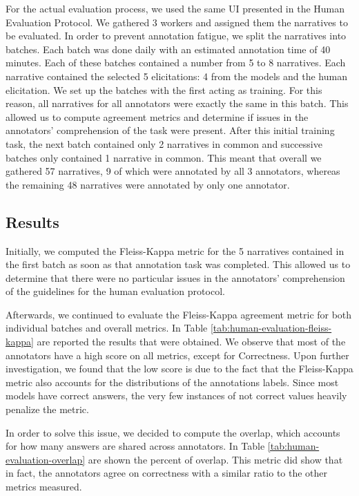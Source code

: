 For the actual evaluation process, we used the same UI presented in the Human Evaluation Protocol. %
We gathered 3 workers and assigned them the narratives to be evaluated.  
In order to prevent annotation fatigue, we split the narratives into batches. Each batch was done daily with an estimated annotation time of 40 minutes. Each of these batches contained a number from 5 to 8 narratives. Each narrative contained the selected 5 elicitations: 4 from the models and the human elicitation. We set up the batches with the first acting as training. For this reason, all narratives for all annotators were exactly the same in this batch. This allowed us to compute agreement metrics and determine if issues in the annotators' comprehension of the task were present. After this initial training task, the next batch contained only 2 narratives in common and successive batches only contained 1 narrative in common. This meant that overall we gathered 57 narratives, 9 of which were annotated by all 3 annotators, whereas the remaining 48 narratives were annotated by only one annotator. 


\subsection{Results}
Initially, we computed the Fleiss-Kappa \cite{fleiss} metric for the 5 narratives contained in the first batch as soon as that annotation task was completed. This allowed us to determine that there were no particular issues in the annotators' comprehension of the guidelines for the human evaluation protocol.


Afterwards, we continued to evaluate the Fleiss-Kappa \cite{fleiss} agreement metric for both individual batches and overall metrics. In Table \ref{tab:human-evaluation-fleiss-kappa} are reported the results that were obtained. We observe that most of the annotators have a high score on all metrics, except for Correctness. Upon further investigation, we found that the low score is due to the fact that the Fleiss-Kappa metric also accounts for the distributions of the annotations labels. Since most models have correct answers, the very few instances of not correct values heavily penalize the metric.

In order to solve this issue, we decided to compute the overlap, which accounts for how many answers are shared across annotators. In Table \ref{tab:human-evaluation-overlap} are shown the percent of overlap. This metric did show that in fact, the annotators agree on correctness with a similar ratio to the other metrics measured. 



